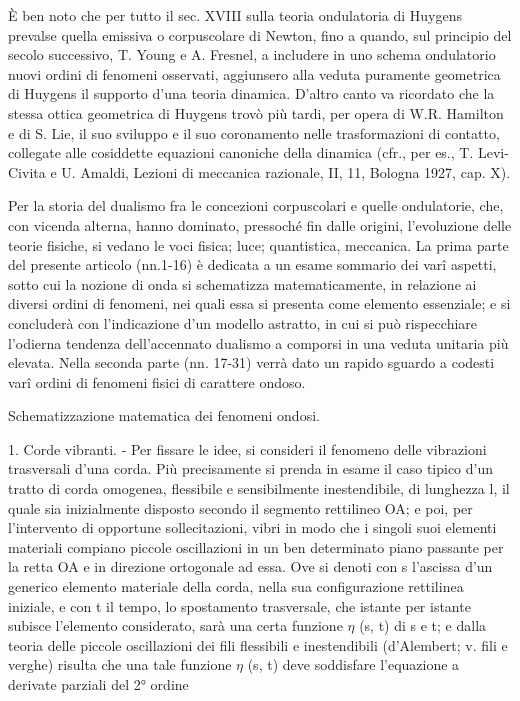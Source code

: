 \documentclass[a4paper]{article}
\begin{document}
È ben noto che per tutto il sec. XVIII sulla teoria ondulatoria di Huygens prevalse quella emissiva o corpuscolare di Newton, fino a quando, sul principio del secolo successivo, T. Young e A. Fresnel, a includere in uno schema ondulatorio nuovi ordini di fenomeni osservati, aggiunsero alla veduta puramente geometrica di Huygens il supporto d'una teoria dinamica. D'altro canto va ricordato che la stessa ottica geometrica di Huygens trovò più tardi, per opera di W.R. Hamilton e di S. Lie, il suo sviluppo e il suo coronamento nelle trasformazioni di contatto, collegate alle cosiddette equazioni canoniche della dinamica (cfr., per es., T. Levi-Civita e U. Amaldi, Lezioni di meccanica razionale, II, 11, Bologna 1927, cap. X).

Per la storia del dualismo fra le concezioni corpuscolari e quelle ondulatorie, che, con vicenda alterna, hanno dominato, pressoché fin dalle origini, l'evoluzione delle teorie fisiche, si vedano le voci fisica; luce; quantistica, meccanica. La prima parte del presente articolo (nn.1-16) è dedicata a un esame sommario dei varî aspetti, sotto cui la nozione di onda si schematizza matematicamente, in relazione ai diversi ordini di fenomeni, nei quali essa si presenta come elemento essenziale; e si concluderà con l'indicazione d'un modello astratto, in cui si può rispecchiare l'odierna tendenza dell'accennato dualismo a comporsi in una veduta unitaria più elevata. Nella seconda parte (nn. 17-31) verrà dato un rapido sguardo a codesti varî ordini di fenomeni fisici di carattere ondoso.

Schematizzazione matematica dei fenomeni ondosi.

1. Corde vibranti. - Per fissare le idee, si consideri il fenomeno delle vibrazioni trasversali d'una corda. Più precisamente si prenda in esame il caso tipico d'un tratto di corda omogenea, flessibile e sensibilmente inestendibile, di lunghezza l, il quale sia inizialmente disposto secondo il segmento rettilineo OA; e poi, per l'intervento di opportune sollecitazioni, vibri in modo che i singoli suoi elementi materiali compiano piccole oscillazioni in un ben determinato piano passante per la retta OA e in direzione ortogonale ad essa. Ove si denoti con s l'ascissa d'un generico elemento materiale della corda, nella sua configurazione rettilinea iniziale, e con t il tempo, lo spostamento trasversale, che istante per istante subisce l'elemento considerato, sarà una certa funzione $\eta$ (s, t) di s e t; e dalla teoria delle piccole oscillazioni dei fili flessibili e inestendibili (d'Alembert; v. fili e verghe) risulta che una tale funzione $\eta$ (s, t) deve soddisfare l'equazione a derivate parziali del 2° ordine
\end{document}
